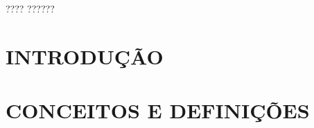 \documentclass[
    12pt,       %
    oneside,    %
    a4paper,    %
%
    chapter=TITLE,	  	  %
%
    english,			  %
    brazil				  %
%
]{abntex2}
\begin{document}
\begin{siglas}
  \item[????] ??????%
\end{siglas}


\tableofcontents*
\cleardoublepage{}



\textual{}
\chapter{INTRODUÇÃO}
\label{chapter:introducao}


\chapter{CONCEITOS E DEFINIÇÕES}
\label{chapter:fundamentacao}

\end{document}
